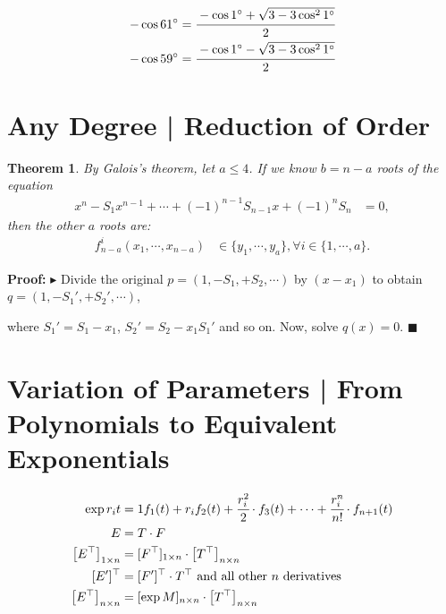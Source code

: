 \documentclass[11pt,a4paper]{article}
\newtheorem{thm}{Theorem}
\begin{document}
\begin{align}
- \cos 61\degree &= \cfrac{- \cos 1\degree + \sqrt{3 - 3 \cos^2 1\degree}}{2} \\
- \cos 59\degree &= \cfrac{- \cos 1\degree - \sqrt{3 - 3 \cos^2 1\degree}}{2}
\end{align}

\section{Any Degree | Reduction of Order}

\begin{thm}
By Galois's theorem, let $a \le 4$. If we know $b = n - a$ roots of the equation
\begin{align}
x^n - S_1 x^{n - 1} + \cdots + (-1)^{n - 1} S_{n - 1} x + (-1)^n S_n &= 0,
\end{align}
then the other $a$ roots are:
\begin{align}
f_{n - a}^i(x_1, \cdots, x_{n - a}) &\in \{ y_1, \cdots, y_a \}, \forall i \in \{ 1, \cdots, a \}.
\end{align}
\end{thm}

\vspace{3mm}

\textbf{Proof:} $\blacktriangleright\,\,$Divide the original $p = (1, -S_1, + S_2, \cdots)$ by $(x - x_1)$ to obtain $q = (1, -S_1', + S_2', \cdots)$,

where $S_1' = S_1 - x_1$, $S_2' = S_2 - x_1 S_1'$ and so on. Now, solve $q(x) = 0$.$\,\,\blacksquare$

\section{Variation of Parameters | From Polynomials to Equivalent Exponentials}

\begin{align}
\exp r_i t &= 1 f_1(t) + r_i f_2(t) + \cfrac{r_i^2}{2}\cdot f_3(t) + \cdots + \cfrac{r_i^n}{n!}\cdot f_{n + 1}(t) \\
E &= T\cdot F \\
\left[E^\top \right]_{1 \times n} &= [F^\top]_{1 \times n} \cdot \left[T^\top \right]_{n \times n} \\
[E']^\top &= [F']^\top\cdot T^\top \text{ and all other }n\text{ derivatives} \\
\left[E^\top \right]_{n \times n} &= [\exp M]_{n \times n} \cdot \left[T^\top \right]_{n \times n}
\end{align}
\end{document}
